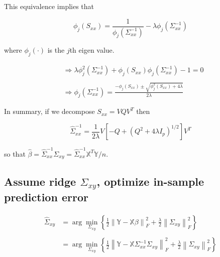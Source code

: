 \documentclass[11pt,]{book}
\theoremstyle{definition}
\theoremstyle{definition}
\theoremstyle{definition}
\theoremstyle{remark}
\begin{document}
This equivalence implies that

\[ \phi_{j}\left( S_{xx} \right) = \frac{1}{\phi_{j}(\Sigma_{xx}^{-1})} - \lambda\phi_{j}\left( \Sigma_{xx}^{-1} \right) \]

where \(\phi_{j}(\cdot)\) is the \(j\)th eigen value.

\begin{align*}
  &\Rightarrow \lambda\phi_{j}^{2}\left( \Sigma_{xx}^{-1} \right) + \phi_{j}\left( S_{xx} \right)\phi_{j}\left( \Sigma_{xx}^{-1} \right) - 1 = 0 \\
  & \\
  &\Rightarrow \phi_{j}\left( \Sigma_{xx}^{-1} \right) = \frac{-\phi_{j}\left( S_{xx} \right) \pm \sqrt{\phi_{j}^{2}\left( S_{xx} \right) + 4\lambda}}{2\lambda}
\end{align*}

In summary, if we decompose \(S_{xx} = VQV^{T}\) then

\[ \hat{\Sigma}_{xx}^{-1} = \frac{1}{2\lambda}V\left[ -Q + \left( Q^{2} + 4\lambda I_{p} \right)^{1/2} \right]V^{T} \]

so that
\(\hat{\beta} = \hat{\Sigma}_{xx}^{-1}\Sigma_{xy} = \hat{\Sigma}_{xx}^{-1}\mathbb{X}^{T}\mathbb{Y}/n\).

\vspace{0.5cm}

\hypertarget{assume-ridge-sigma_xy-optimize-in-sample-prediction-error}{%
\subsection{\texorpdfstring{Assume ridge \(\Sigma_{xy}\), optimize
in-sample prediction
error}{Assume ridge \textbackslash{}Sigma\_\{xy\}, optimize in-sample prediction error}}\label{assume-ridge-sigma_xy-optimize-in-sample-prediction-error}}

\begin{align*}
  \hat{\Sigma}_{xy} &= \arg\min_{\Sigma_{xy}}\left\{ \frac{1}{2}\left\| \mathbb{Y} - \mathbb{X}\mathbb{\beta} \right\|_{F}^{2} + \frac{\lambda}{2}\left\| \Sigma_{xy} \right\|_{F}^{2} \right\} \\
  & \\
  &= \arg\min_{\Sigma_{xy}}\left\{ \frac{1}{2}\left\| \mathbb{Y} - \mathbb{X}\Sigma_{xx}^{-1}\Sigma_{xy} \right\|_{F}^{2} + \frac{\lambda}{2}\left\| \Sigma_{xy} \right\|_{F}^{2} \right\} \\
\end{align*}
\end{document}
